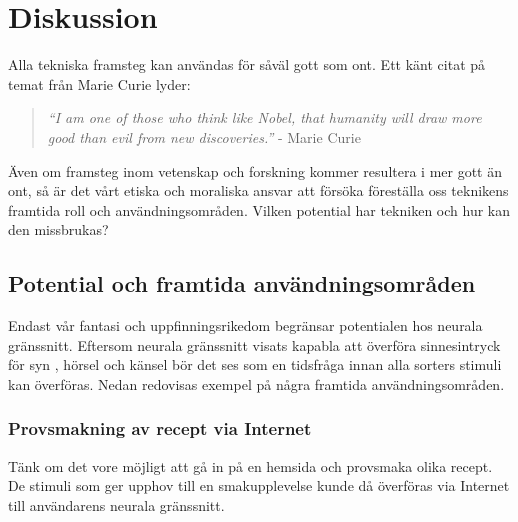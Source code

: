 \documentclass[12pt, a4paper]{article}
\begin{document}


\section{Diskussion}

Alla tekniska framsteg kan användas för såväl gott som ont. Ett känt citat på temat från Marie Curie lyder:

\begin{quote}
	\textit{``I am one of those who think like Nobel, that humanity will draw more good than evil from new discoveries.''} - Marie Curie \cite{curie_quote}
\end{quote}

Även om framsteg inom vetenskap och forskning kommer resultera i mer gott än ont, så är det vårt etiska och moraliska ansvar att försöka föreställa oss teknikens framtida roll och användningsområden. Vilken potential har tekniken och hur kan den missbrukas?


\subsection{Potential och framtida användningsområden}

Endast vår fantasi och uppfinningsrikedom begränsar potentialen hos neurala gränssnitt. Eftersom neurala gränssnitt visats kapabla att överföra sinnesintryck för syn \cite{sight1,sight2}, hörsel \cite{sound} och känsel \cite{touch} bör det ses som en tidsfråga innan alla sorters stimuli kan överföras. Nedan redovisas exempel på några framtida användningsområden.


\subsubsection{Provsmakning av recept via Internet}

Tänk om det vore möjligt att gå in på en hemsida och provsmaka olika recept. De stimuli som ger upphov till en smakupplevelse kunde då överföras via Internet till användarens neurala gränssnitt.
\end{document}
